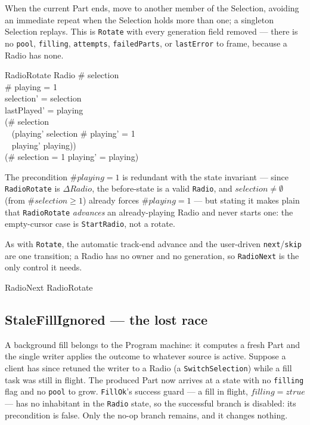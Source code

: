 \documentclass[a4paper,10pt,fleqn]{article}
\begin{document}
When the current Part ends, move to another member of the Selection, avoiding an
immediate repeat when the Selection holds more than one; a singleton Selection
replays. This is \texttt{Rotate} with every generation field removed --- there
is no \texttt{pool}, \texttt{filling}, \texttt{attempts}, \texttt{failedParts},
or \texttt{lastError} to frame, because a Radio has none.

\begin{schema}{RadioRotate}
  \Delta Radio
  \where
  \# selection  \\
  \# playing = 1 \\
  selection' = selection \\
  lastPlayed' = playing \\
  (\# selection  \implies \\
    \quad~ (playing' \subseteq selection \land \# playing' = 1 \\
    \quad~ \land playing' \neq playing)) \\
  (\# selection = 1 \implies playing' = playing)
\end{schema}

The precondition $\# playing = 1$ is redundant with the state invariant --- since
\texttt{RadioRotate} is $\Delta Radio$, the before-state is a valid \texttt{Radio},
and $selection \neq \emptyset$ (from $\# selection \geq 1$) already forces
$\# playing = 1$ --- but stating it makes plain that \texttt{RadioRotate}
\emph{advances} an already-playing Radio and never starts one: the empty-cursor
case is \texttt{StartRadio}, not a rotate.

As with \texttt{Rotate}, the automatic track-end advance and the user-driven
\texttt{next}/\texttt{skip} are one transition; a Radio has no owner and no
generation, so \texttt{RadioNext} is the only control it needs.

\begin{zed}
  RadioNext  RadioRotate
\end{zed}

\subsection{StaleFillIgnored --- the lost race}

A background fill belongs to the Program machine: it computes a fresh Part and
the single writer applies the outcome to whatever source is active. Suppose a
client has since retuned the writer to a Radio (a \texttt{SwitchSelection})
while a fill task was still in flight. The produced Part now arrives at a state
with no \texttt{filling} flag and no \texttt{pool} to grow. \texttt{FillOk}'s
success guard --- a fill in flight, $filling = ztrue$ --- has no inhabitant in
the \texttt{Radio} state, so the successful branch is disabled: its precondition
is false. Only the no-op branch remains, and it changes nothing.
\end{document}
